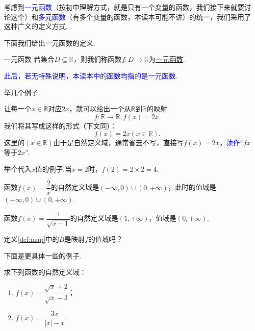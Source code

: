 \documentclass[lang=cn,math=cm,chinesefont=nofont,11pt,scheme=chinese,twocol]{elegantbook}
\begin{document}
考虑到\textcolor{blue}{一元函数}（按初中理解方式，就是只有一个变量的函数，我们接下来就要讨论这个）和\textcolor{blue}{多元函数}（有多个变量的函数，本读本可能不讲）的统一，我们采用了这种广义的定义方式.

下面我们给出一元函数的定义.

\begin{definition}{一元函数}
  若集合$D\subseteq \mathbb{R}$，则我们称函数$f:D\rightarrow\mathbb{R}$为\underline{一元函数}.
\end{definition}

\textcolor{blue}{此后，若无特殊说明，本读本中的函数均指的是一元函数.}

举几个例子.

\begin{example}\label{MapExample2}
  让每一个$x\in\mathbb{R}$对应$2x$，就可以给出一个从$\mathbb{R}$到$\mathbb{R}$的映射$$f:\mathbb{R}\rightarrow\mathbb{R},f(x)=2x.$$我们将其写成这样的形式（下文同）：$$f(x)=2x(x\in\mathbb{R}).$$这里的$(x\in\mathbb{R})$由于是自然定义域，通常省去不写，直接写$f(x)=2x$，\textcolor{blue}{读作}“$fx$等于$2x$”.

  举个代入$x$值的例子.当$x=2$时，$f(2)=2\times 2=4$.
\end{example}

\begin{spacing}{2.0}
  \begin{example}
    函数$f(x)=\dfrac{2}{x}$的自然定义域是$(-\infty,0)\cup(0,+\infty)$，此时的值域是$(-\infty,0)\cup(0,+\infty)$.
  \end{example}
  
  \begin{example}
    函数$f(x)=\dfrac{1}{\sqrt{x-1}}$的自然定义域是$(1,+\infty)$，值域是$(0,+\infty)$.
  \end{example}

  \begin{exercise}
    定义\ref{def:map}中的$B$是映射$f$的值域吗？
  \end{exercise}
  
  下面是更具体一些的例子.
  
  \begin{example}
    求下列函数的自然定义域：
  \end{example}
  
  \begin{enumerate}
    \item $f(x)=\dfrac{\sqrt{x}+2}{\sqrt{x}-3}$；
    \item $f(x)=\dfrac{3x}{\left| x \right|-x}$.
  \end{enumerate}
\end{spacing}
\end{document}
